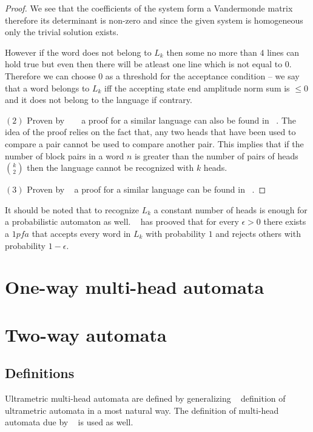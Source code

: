 \documentclass{llncs}
\begin{document}
\begin{definicija}
\begin{proof}
We see that the coefficients of the system form a Vandermonde matrix therefore its determinant is non-zero and since the given system is homogeneous only the trivial solution exists.

However if the word does not belong to $L_k$ then some no more than $4$ lines can hold true but even then there will be atleast one line which is not equal to $0$. %
Therefore we can choose $0$ as a threshold for the acceptance condition -- we say that a word belongs to $L_k$ iff the accepting state end amplitude norm sum is $\leq 0$ and it does not belong to the language if contrary.

$(2)$ Proven by ~\citet{Freivalds1982} ~\citep{Freivalds1979} a proof for a similar language can also be found in ~\citep{Yao1978}. The idea of the proof relies on the fact that, any two heads that have been used to compare a pair cannot be used to compare another pair. This implies that if the number of block pairs in a word $n$ is greater than the number of pairs of heads ${k\choose 2}$ then the language cannot be recognized with $k$ heads.

$(3)$ Proven by ~\citet{Freivalds1982} a proof for a similar language can be found in ~\citep{Yao1978}.
\end{proof}

It should be noted that to recognize $L_k$ a constant number of heads is enough for a probabilistic automaton as well. ~\citet{Freivalds1982} has prooved that for every $\epsilon > 0$ there exists a $1pfa$ that accepts every word in $L_k$ with probability $1$ and rejects others with probability $1 - \epsilon$.

\chapter{One-way multi-head automata}

\chapter{Two-way automata}
\section{Definitions}
Ultrametric multi-head automata are defined by generalizing ~\citep{KasparsBalodis2013} definition of ultrametric automata in a most natural way. The definition of multi-head automata due by ~\citep{Holzer2009} is used as well.


\end{definicija}
\end{document}
